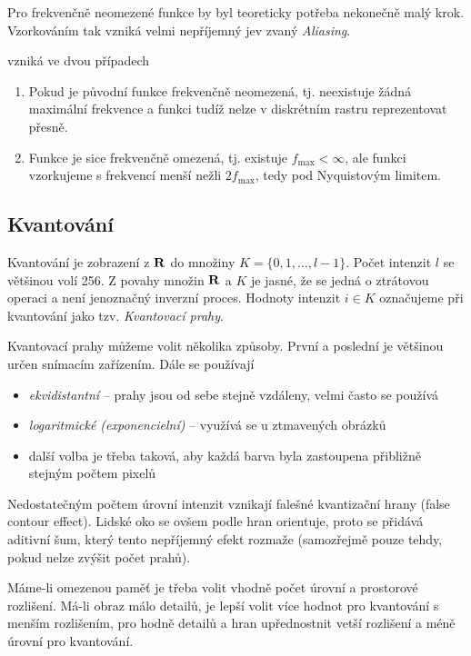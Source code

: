 Pro frekvenčně neomezené funkce by byl teoreticky potřeba nekonečně malý krok. Vzorkováním tak vzniká velmi
nepříjemný jev zvaný {\em Aliasing}.

 vzniká ve dvou případech
\begin{enumerate}
\item Pokud je původní funkce frekvenčně neomezená, tj. neexistuje žádná maximální frekvence a funkci tudíž nelze v diskrétním
rastru reprezentovat přesně.
\item Funkce je sice frekvenčně omezená, tj. existuje $f_{\max}<\infty$, ale funkci vzorkujeme s frekvencí menší nežli
$2f_{\max}$, tedy pod Nyquistovým limitem.
\end{enumerate}

\subsection{Kvantování} 

Kvantování je zobrazení z $\mathbf{R}$ do množiny $K=\{0,1,\dots,l-1\}$. Počet intenzit $l$ se většinou volí 256.
Z povahy množin $\mathbf{R}$ a $K$ je jasné, že se jedná o ztrátovou operaci a není jenoznačný inverzní proces. Hodnoty intenzit
$i\in K$ označujeme při kvantování jako tzv. {\em Kvantovací prahy}.

Kvantovací prahy můžeme volit několika způsoby. První a poslední je většinou určen snímacím zařízením. Dále se používají
\begin{itemize}
\item {\em ekvidistantní} -- prahy jsou od sebe stejně vzdáleny, velmi často se používá
\item {\em logaritmické (exponencielní)} -- využívá se u ztmavených obrázků
\item další volba je třeba taková, aby každá barva byla zastoupena přibližně stejným počtem pixelů
\end{itemize}

Nedostatečným počtem úrovní intenzit  vznikají falešné kvantizační hrany (false contour effect). Lidské oko se ovšem
podle hran orientuje, proto se přidává aditivní šum, který tento nepříjemný efekt rozmaže (samozřejmě pouze tehdy, pokud 
nelze zvýšit počet prahů).

Máme-li omezenou paměť je třeba volit vhodně počet úrovní a prostorové rozlišení.
Má-li obraz málo detailů, je lepší volit více hodnot pro kvantování s menším rozlišením,
pro hodně detailů a hran upřednostnit vetší rozlišení a méně úrovní pro kvantování.

